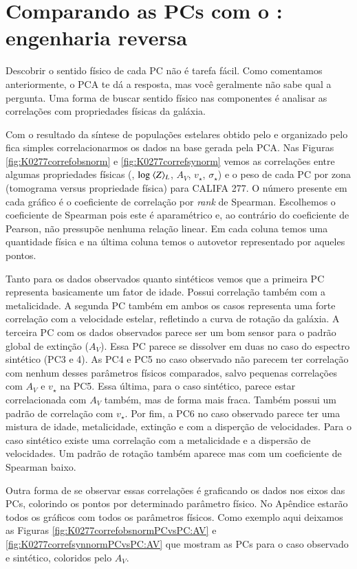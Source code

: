 \section{Comparando as PCs com o \STARLIGHT: engenharia reversa}
\label{sec:PCAaplic:EngRev}

Descobrir o sentido físico de cada PC não é tarefa fácil. Como comentamos anteriormente, o PCA te dá a resposta, mas
você geralmente não sabe qual a pergunta. Uma forma de buscar sentido físico nas componentes é analisar as correlações
com propriedades físicas da galáxia.

Com o resultado da síntese de populações estelares obtido pelo \starlight e organizado pelo \pycasso fica simples
correlacionarmos os dados na base gerada pela PCA. Nas Figuras \ref{fig:K0277correfobsnorm} e
\ref{fig:K0277correfsynorm} vemos as correlações entre algumas propriedades físicas (, $\log\ \meanL{Z}$,
$A_V$, $v_{\star}$, $\sigma_{\star}$) e o peso de cada PC por zona (tomograma versus propriedade física) para CALIFA
277. O número presente em cada gráfico é o coeficiente de correlação por {\em rank} de Spearman. Escolhemos o
coeficiente de Spearman pois este é aparamétrico e, ao contrário do coeficiente de Pearson, não pressupõe nenhuma
relação linear. Em cada coluna temos uma quantidade física e na última coluna temos o autovetor representado por aqueles
pontos.

Tanto para os dados observados quanto sintéticos vemos que a primeira PC representa basicamente um fator de idade.
Possui correlação também com a metalicidade. A segunda PC também em ambos os casos representa uma forte correlação com a
velocidade estelar, refletindo a curva de rotação da galáxia. A terceira PC com os dados observados parece ser um bom
sensor para o padrão global de extinção ($A_V$). Essa PC parece se dissolver em duas no caso do espectro sintético (PC3
e 4). As PC4 e PC5 no caso observado não parecem ter correlação com nenhum desses parâmetros físicos comparados, salvo
pequenas correlações com $A_V$ e $v_\star$ na PC5. Essa última, para o caso sintético, parece estar correlacionada com
$A_V$ também, mas de forma mais fraca. Também possui um padrão de correlação com $v_\star$. Por fim, a PC6 no caso
observado parece ter uma mistura de idade, metalicidade, extinção e com a disperção de velocidades. Para o caso
sintético existe uma correlação com a metalicidade e a dispersão de velocidades. Um padrão de rotação também aparece mas
com um coeficiente de Spearman baixo.

Outra forma de se observar essas correlações é graficando os dados nos eixos das PCs, colorindo os pontos por
determinado parâmetro físico. No Apêndice estarão todos os gráficos com todos os parâmetros físicos. Como exemplo aqui
deixamos as Figuras \ref{fig:K0277correfobsnormPCvsPC:AV} e \ref{fig:K0277correfsynnormPCvsPC:AV} que mostram
as PCs para o caso observado e sintético, coloridos pelo $A_V$.

